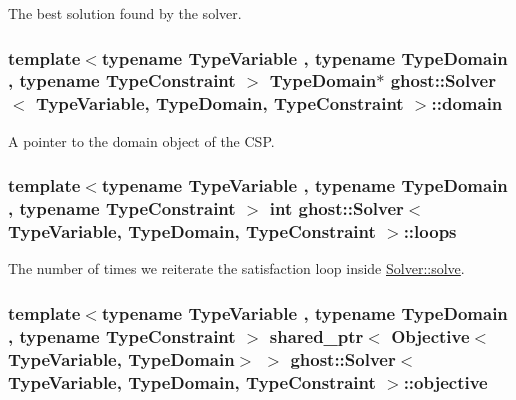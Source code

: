 The best solution found by the solver. 

\hypertarget{classghost_1_1Solver_ad9292e9219261ba8058fec05b453c0c9}{
\subsubsection[{domain}]{\setlength{\rightskip}{0pt plus 5cm}template$<$typename Type\-Variable , typename Type\-Domain , typename Type\-Constraint $>$ Type\-Domain$\ast$ {\bf ghost\-::\-Solver}$<$ Type\-Variable, Type\-Domain, Type\-Constraint $>$\-::domain\hspace{0.3cm}{\ttfamily [private]}}}\label{classghost_1_1Solver_ad9292e9219261ba8058fec05b453c0c9}


A pointer to the domain object of the C\-S\-P. 

\hypertarget{classghost_1_1Solver_aa6a77e14862a9be467e6c6c76124b526}{
\subsubsection[{loops}]{\setlength{\rightskip}{0pt plus 5cm}template$<$typename Type\-Variable , typename Type\-Domain , typename Type\-Constraint $>$ int {\bf ghost\-::\-Solver}$<$ Type\-Variable, Type\-Domain, Type\-Constraint $>$\-::loops\hspace{0.3cm}{\ttfamily [private]}}}\label{classghost_1_1Solver_aa6a77e14862a9be467e6c6c76124b526}


The number of times we reiterate the satisfaction loop inside \hyperlink{classghost_1_1Solver_a30dd2769fb30ac42d231d2c305dcdf13}{Solver\-::solve}. 

\hypertarget{classghost_1_1Solver_a4fd74bd68d0ea253fd35adad697f964d}{
\subsubsection[{objective}]{\setlength{\rightskip}{0pt plus 5cm}template$<$typename Type\-Variable , typename Type\-Domain , typename Type\-Constraint $>$ shared\-\_\-ptr$<$ {\bf Objective}$<$Type\-Variable, Type\-Domain$>$ $>$ {\bf ghost\-::\-Solver}$<$ Type\-Variable, Type\-Domain, Type\-Constraint $>$\-::objective\hspace{0.3cm}{\ttfamily [private]}}}\label{classghost_1_1Solver_a4fd74bd68d0ea253fd35adad697f964d}


